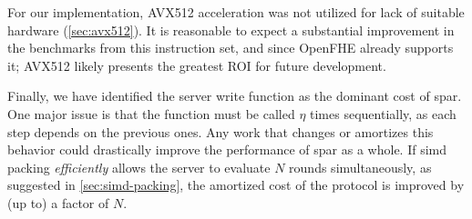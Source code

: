 For our implementation, AVX512 acceleration was not utilized for lack of suitable hardware (\cref{sec:avx512}). It is reasonable to expect a substantial improvement in the benchmarks from this instruction set, and since OpenFHE already supports it; AVX512 likely presents the greatest ROI for future development. %

Finally, we have identified the server write function as the dominant cost of \gls{spar}. One major issue is that the function must be called $\eta$ times sequentially, as each step depends on the previous ones. Any work that changes or amortizes this behavior could drastically improve the performance of \gls{spar} as a whole. If \gls{simd} packing \emph{efficiently} allows the server to evaluate $N$ rounds simultaneously, as suggested in \cref{sec:simd-packing}, the amortized cost of the protocol is improved by (up to) a factor of $N$.


